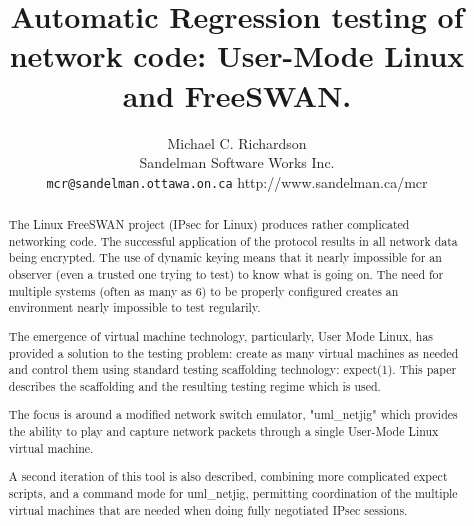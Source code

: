\documentclass{article}
\author{Michael C. Richardson\\
	Sandelman Software Works Inc.\\
{\normalsize {\tt mcr@sandelman.ottawa.on.ca} http://www.sandelman.ca/mcr} \\}
\date{}
\title{\Large \bf Automatic Regression testing of network code: User-Mode Linux and FreeSWAN.}
\begin{document}
\maketitle\newpage

\begin{abstract}

The Linux FreeSWAN project (IPsec for Linux) produces rather complicated
networking code. The successful application of the protocol results in all
network data being encrypted. The use of dynamic keying means that it nearly
impossible for an observer (even a trusted one trying to test) to know
what is going on. The need for multiple systems (often as many as 6) to be
properly configured creates an environment nearly impossible to test
regularily.

The emergence of virtual machine technology, particularly, User Mode Linux,
has provided a solution to the testing problem: create as many virtual
machines as needed and control them using standard testing scaffolding
technology: expect(1). This paper describes the scaffolding and the resulting
testing regime which is used. 

The focus is around a modified network switch emulator, "uml\_netjig" which
provides the ability to play and capture network packets through a single
User-Mode Linux virtual machine. 

A second iteration of this tool is also described, combining more complicated 
expect scripts, and a command mode for uml\_netjig, permitting coordination of 
the multiple virtual machines that are needed when doing fully negotiated
IPsec sessions.

\end{abstract}










\end{document}
